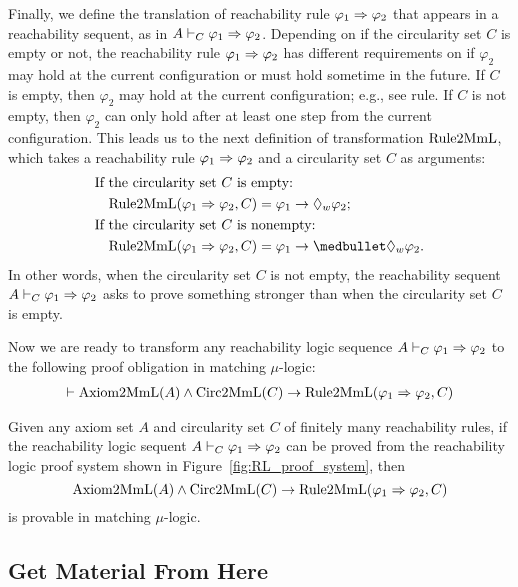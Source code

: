 \documentclass{amsart}
\begin{document}
Finally, we define the translation of reachability rule $\varphi_1 \Rightarrow \varphi_2$
that appears in a reachability sequent, as in $A \vdash_C \varphi_1 \Rightarrow \varphi_2$.
Depending on if the circularity set $C$ is empty or not,
the reachability rule $\varphi_1 \Rightarrow \varphi_2$ has different requirements
on if $\varphi_2$ may hold at the current configuration or must hold sometime
in the future. 
If $C$ is empty, then $\varphi_2$ may hold at the current configuration;
e.g., see  rule.
If $C$ is not empty, then $\varphi_2$ can only hold after at least one step
from the current configuration. 
This leads us to the next definition of transformation $\mathrm{Rule2MmL}$,
which takes a reachability rule $\varphi_1 \Rightarrow \varphi_2$
and a circularity set $C$ as arguments:
\begin{align*}
&\text{If the circularity set $C$ is empty:}\\
&\quad \transR(\varphi_1 \To \varphi_2, C) = \varphi_1 \imp \eventually_w \varphi_2; \\
&\text{If the circularity set $C$ is nonempty:}\\
&\quad \transR(\varphi_1 \To \varphi_2, C) = \varphi_1 \imp \snext \eventually_w \varphi_2.\\
\end{align*}
In other words, when the circularity set $C$ is not empty, 
the reachability sequent $A \vdash_C \varphi_1 \Rightarrow \varphi_2$
asks to prove something stronger than when the circularity set $C$ is empty.

Now we are ready to transform any reachability logic sequence
$A \vdash_C \varphi_1 \Rightarrow \varphi_2$ to the following proof obligation
in matching $\mu$-logic:
\begin{align*}
\vdash
\mathrm{Axiom2MmL}(A) \wedge \mathrm{Circ2MmL}(C) \to \mathrm{Rule2MmL}(\varphi_1 \Rightarrow \varphi_2, C)
\end{align*}

\begin{proposition}
Given any axiom set $A$ and circularity set $C$ of finitely many reachability rules,
if the reachability logic sequent $A \vdash_C \varphi_1 \Rightarrow \varphi_2$
can be proved from the reachability logic proof system 
shown in Figure~\ref{fig:RL_proof_system},
then
$$
\mathrm{Axiom2MmL}(A) \wedge \mathrm{Circ2MmL}(C) \to \mathrm{Rule2MmL}(\varphi_1 \Rightarrow \varphi_2, C)
$$
is provable in matching $\mu$-logic.

\end{proposition}

\subsection{Get Material From Here}
\end{document}
